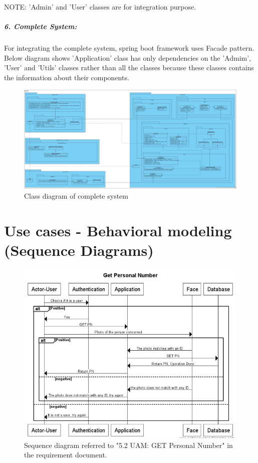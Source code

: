 \documentclass[a4paper,11pt]{article}
\begin{document}
NOTE: 'Admin' and 'User' classes are  for integration purpose.


\newpage


\subparagraph{6. Complete System: }
For integrating the complete system, spring boot framework uses Facade pattern. Below diagram shows 'Application' class has only dependencies on the 'Admim', 'User' and 'Utils' classes rather than all the classes because these classes contains the information about their components.
\begin{figure}[ht!]
    \centering
	\includegraphics[width=170mm]{ClassDiagrams/new/system.jpg}
	\caption{Class diagram of complete system}
\end{figure}

\newpage
\section{Use cases - Behavioral modeling (Sequence Diagrams)}

\begin{figure}[ht!]
	\centering
	\includegraphics[width=150mm]{SequenceDiagrams/GetPN.jpg}
	\caption{Sequence diagram referred to "5.2 UAM: GET Personal Number" in the requirement document. \label{1}}
\end{figure}
\end{document}
